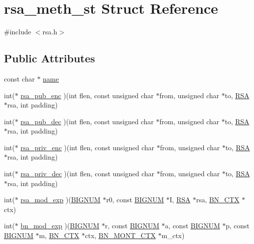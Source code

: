 \hypertarget{structrsa__meth__st}{}\section{rsa\+\_\+meth\+\_\+st Struct Reference}
\label{structrsa__meth__st}


{\ttfamily \#include $<$rsa.\+h$>$}

\subsection*{Public Attributes}
\begin{DoxyCompactItemize}
\item 
const char $\ast$ \hyperlink{structrsa__meth__st_a7ce6d4139c1e9e8b220d2d3b3f240a14}{name}
\item 
int($\ast$ \hyperlink{structrsa__meth__st_a6ff51f7f2fd9b5b7e16a30616301caa7}{rsa\+\_\+pub\+\_\+enc} )(int flen, const unsigned char $\ast$from, unsigned char $\ast$to, \hyperlink{ossl__typ_8h_a9ad4496a11f0a9f686bea793cb97f8b5}{R\+SA} $\ast$rsa, int padding)
\item 
int($\ast$ \hyperlink{structrsa__meth__st_a4eb63fb1e1abbe10f8cd81c1efef8cf4}{rsa\+\_\+pub\+\_\+dec} )(int flen, const unsigned char $\ast$from, unsigned char $\ast$to, \hyperlink{ossl__typ_8h_a9ad4496a11f0a9f686bea793cb97f8b5}{R\+SA} $\ast$rsa, int padding)
\item 
int($\ast$ \hyperlink{structrsa__meth__st_abb623f4c63d15a39af63ec2ead7cf803}{rsa\+\_\+priv\+\_\+enc} )(int flen, const unsigned char $\ast$from, unsigned char $\ast$to, \hyperlink{ossl__typ_8h_a9ad4496a11f0a9f686bea793cb97f8b5}{R\+SA} $\ast$rsa, int padding)
\item 
int($\ast$ \hyperlink{structrsa__meth__st_a0a9fcf9d1e4799ab69233c2187921fe1}{rsa\+\_\+priv\+\_\+dec} )(int flen, const unsigned char $\ast$from, unsigned char $\ast$to, \hyperlink{ossl__typ_8h_a9ad4496a11f0a9f686bea793cb97f8b5}{R\+SA} $\ast$rsa, int padding)
\item 
int($\ast$ \hyperlink{structrsa__meth__st_a055a4194b3a73d653111656553b2ae8c}{rsa\+\_\+mod\+\_\+exp} )(\hyperlink{ossl__typ_8h_a6fb19728907ec6515e4bfb716bffa141}{B\+I\+G\+N\+UM} $\ast$r0, const \hyperlink{ossl__typ_8h_a6fb19728907ec6515e4bfb716bffa141}{B\+I\+G\+N\+UM} $\ast$I, \hyperlink{ossl__typ_8h_a9ad4496a11f0a9f686bea793cb97f8b5}{R\+SA} $\ast$rsa, \hyperlink{ossl__typ_8h_a0b235a35b7dd7922c097571ecd90e2bc}{B\+N\+\_\+\+C\+TX} $\ast$ctx)
\item 
int($\ast$ \hyperlink{structrsa__meth__st_a1dc3f40f6072ffed989d7dfedc66cda1}{bn\+\_\+mod\+\_\+exp} )(\hyperlink{ossl__typ_8h_a6fb19728907ec6515e4bfb716bffa141}{B\+I\+G\+N\+UM} $\ast$r, const \hyperlink{ossl__typ_8h_a6fb19728907ec6515e4bfb716bffa141}{B\+I\+G\+N\+UM} $\ast$a, const \hyperlink{ossl__typ_8h_a6fb19728907ec6515e4bfb716bffa141}{B\+I\+G\+N\+UM} $\ast$p, const \hyperlink{ossl__typ_8h_a6fb19728907ec6515e4bfb716bffa141}{B\+I\+G\+N\+UM} $\ast$m, \hyperlink{ossl__typ_8h_a0b235a35b7dd7922c097571ecd90e2bc}{B\+N\+\_\+\+C\+TX} $\ast$ctx, \hyperlink{ossl__typ_8h_aec902d353e00ced6d3fee6cd033a8bd0}{B\+N\+\_\+\+M\+O\+N\+T\+\_\+\+C\+TX} $\ast$m\+\_\+ctx)

\end{DoxyCompactItemize}
